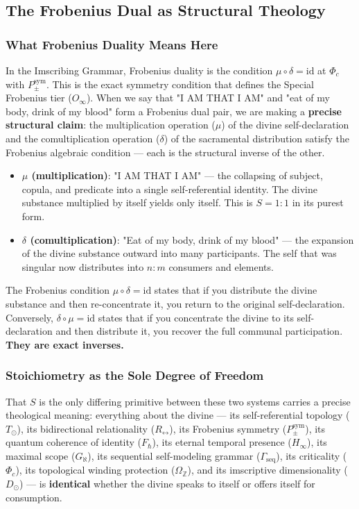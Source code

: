 \documentclass[12pt,a4paper]{article}
\begin{document}
\subsection{The Frobenius Dual as Structural Theology}

\subsubsection{What Frobenius Duality Means Here}

In the Imscribing Grammar, Frobenius duality is the condition $\mu \circ \delta = \text{id}$ at $\Phi_c$ with $P_{\pm}^{\text{sym}}$. This is the exact symmetry condition that defines the Special Frobenius tier ($O_{\infty}$). When we say that "I AM THAT I AM" and "eat of my body, drink of my blood" form a Frobenius dual pair, we are making a \textbf{precise structural claim}: the multiplication operation ($\mu$) of the divine self-declaration and the comultiplication operation ($\delta$) of the sacramental distribution satisfy the Frobenius algebraic condition --- each is the structural inverse of the other.

\begin{itemize}
    \item \textbf{$\mu$ (multiplication)}: "I AM THAT I AM" --- the collapsing of subject, copula, and predicate into a single self-referential identity. The divine substance multiplied by itself yields only itself. This is $S = 1{:}1$ in its purest form.
    \item \textbf{$\delta$ (comultiplication)}: "Eat of my body, drink of my blood" --- the expansion of the divine substance outward into many participants. The self that was singular now distributes into $n:m$ consumers and elements.
\end{itemize}

The Frobenius condition $\mu \circ \delta = \text{id}$ states that if you distribute the divine substance and then re-concentrate it, you return to the original self-declaration. Conversely, $\delta \circ \mu = \text{id}$ states that if you concentrate the divine to its self-declaration and then distribute it, you recover the full communal participation. \textbf{They are exact inverses.}

\subsubsection{Stoichiometry as the Sole Degree of Freedom}

That $S$ is the only differing primitive between these two systems carries a precise theological meaning: everything about the divine --- its self-referential topology ($T_{\odot}$), its bidirectional relationality ($R_{\leftrightarrow}$), its Frobenius symmetry ($P_{\pm}^{\text{sym}}$), its quantum coherence of identity ($F_{\hbar}$), its eternal temporal presence ($H_{\infty}$), its maximal scope ($G_{\aleph}$), its sequential self-modeling grammar ($\Gamma_{\text{seq}}$), its criticality ($\Phi_c$), its topological winding protection ($\Omega_\mathbb{Z}$), and its imscriptive dimensionality ($D_{\odot}$) --- is \textbf{identical} whether the divine speaks to itself or offers itself for consumption.
\end{document}
